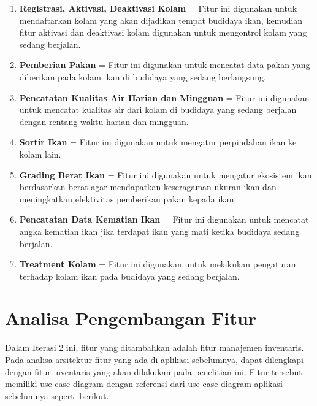 \begin{enumerate}
	\item \textbf{Registrasi, Aktivasi, Deaktivasi Kolam} = Fitur ini digunakan untuk mendaftarkan kolam yang akan dijadikan tempat budidaya ikan, kemudian fitur aktivasi dan deaktivasi kolam digunakan untuk mengontrol kolam yang sedang berjalan.
	\item \textbf{Pemberian Pakan} = Fitur ini digunakan untuk mencatat data pakan yang diberikan pada kolam ikan di budidaya yang sedang berlangsung.
	\item \textbf{Pencatatan Kualitas Air Harian dan Mingguan} = Fitur ini digunakan untuk mencatat kualitas air dari kolam di budidaya yang sedang berjalan dengan rentang waktu harian dan mingguan.
	\item \textbf{Sortir Ikan} = Fitur ini digunakan untuk mengatur perpindahan ikan ke kolam lain.
	\item \textbf{Grading Berat Ikan} = Fitur ini digunakan untuk mengatur ekosistem ikan berdasarkan berat agar mendapatkan keseragaman ukuran ikan dan meningkatkan efektivitas pemberikan pakan kepada ikan.
	\item \textbf{Pencatatan Data Kematian Ikan} = Fitur ini digunakan untuk mencatat angka kematian ikan jika terdapat ikan yang mati ketika budidaya sedang berjalan.
	\item \textbf{Treatment Kolam} = Fitur ini digunakan untuk melakukan pengaturan terhadap kolam ikan pada budidaya yang sedang berjalan.
\end{enumerate}

\section{Analisa Pengembangan Fitur}

Dalam Iterasi 2 ini, fitur yang ditambahkan adalah fitur manajemen inventaris. Pada analisa arsitektur fitur yang ada di aplikasi sebelumnya, dapat dilengkapi dengan fitur inventaris yang akan dilakukan pada penelitian ini. Fitur tersebut memiliki use case diagram dengan referensi dari use case diagram aplikasi sebelumnya seperti berikut.

